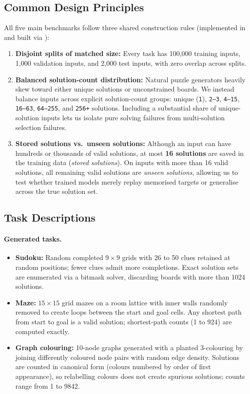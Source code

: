 \documentclass[11pt]{article}
\begin{document}
\subsection{Common Design Principles}
All five main benchmarks follow three shared construction rules (implemented in  and built via ):
\begin{enumerate}
  \item \textbf{Disjoint splits of matched size:} Every task has 100,000 training inputs, 1,000 validation inputs, and 2,000 test inputs, with zero overlap across splits.
  \item \textbf{Balanced solution-count distribution:} Natural puzzle generators heavily skew toward either unique solutions or unconstrained boards. We instead balance inputs across explicit solution-count groups: unique (\texttt{1}), \texttt{2--3}, \texttt{4--15}, \texttt{16--63}, \texttt{64--255}, and \texttt{256+} solutions. Including a substantial share of unique-solution inputs lets us isolate pure solving failures from multi-solution selection failures.
  \item \textbf{Stored solutions vs.\ unseen solutions:} Although an input can have hundreds or thousands of valid solutions, at most \textbf{16 solutions} are saved in the training data (\emph{stored solutions}). On inputs with more than 16 valid solutions, all remaining valid solutions are \emph{unseen solutions}, allowing us to test whether trained models merely replay memorised targets or generalise across the true solution set.
\end{enumerate}

\subsection{Task Descriptions}
\paragraph{Generated tasks.}
\begin{itemize}
  \item \textbf{Sudoku:} Random completed $9\times 9$ grids with 26 to 50 clues retained at random positions; fewer clues admit more completions. Exact solution sets are enumerated via a bitmask solver, discarding boards with more than 1024 solutions.
  \item \textbf{Maze:} $15\times 15$ grid mazes on a room lattice with inner walls randomly removed to create loops between the start and goal cells. Any shortest path from start to goal is a valid solution; shortest-path counts (1 to 924) are computed exactly.
  \item \textbf{Graph colouring:} 10-node graphs generated with a planted 3-colouring by joining differently coloured node pairs with random edge density. Solutions are counted in canonical form (colours numbered by order of first appearance), so relabelling colours does not create spurious solutions; counts range from 1 to 9842.
\end{itemize}
\end{document}
